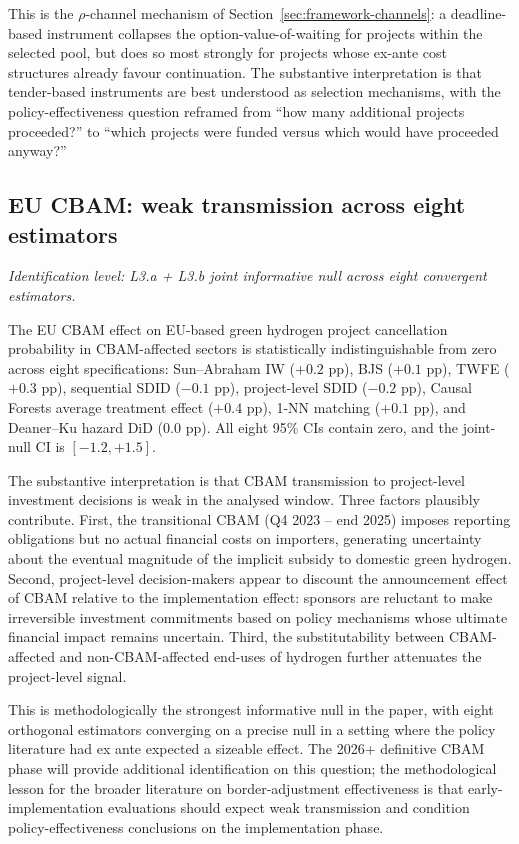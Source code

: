 \documentclass[12pt,a4paper]{article}
\theoremstyle{plain}
\theoremstyle{definition}
\begin{document}
This is the $\rho$-channel mechanism of Section~\ref{sec:framework-channels}: a deadline-based instrument collapses the option-value-of-waiting for projects within the selected pool, but does so most strongly for projects whose ex-ante cost structures already favour continuation. The substantive interpretation is that tender-based instruments are best understood as selection mechanisms, with the policy-effectiveness question reframed from ``how many additional projects proceeded?'' to ``which projects were funded versus which would have proceeded anyway?''

\subsection{EU CBAM: weak transmission across eight estimators}
\label{sec:results-cbam}

\noindent\emph{Identification level: L3.a + L3.b joint informative null across eight convergent estimators.}

The EU CBAM effect on EU-based green hydrogen project cancellation probability in CBAM-affected sectors is statistically indistinguishable from zero across eight specifications: Sun--Abraham IW ($+0.2$ pp), BJS ($+0.1$ pp), TWFE ($+0.3$ pp), sequential SDID ($-0.1$ pp), project-level SDID ($-0.2$ pp), Causal Forests average treatment effect ($+0.4$ pp), 1-NN matching ($+0.1$ pp), and Deaner--Ku hazard DiD ($0.0$ pp). All eight 95\% CIs contain zero, and the joint-null CI is $[-1.2, +1.5]$.

The substantive interpretation is that CBAM transmission to project-level investment decisions is weak in the analysed window. Three factors plausibly contribute. First, the transitional CBAM (Q4 2023 -- end 2025) imposes reporting obligations but no actual financial costs on importers, generating uncertainty about the eventual magnitude of the implicit subsidy to domestic green hydrogen. Second, project-level decision-makers appear to discount the announcement effect of CBAM relative to the implementation effect: sponsors are reluctant to make irreversible investment commitments based on policy mechanisms whose ultimate financial impact remains uncertain. Third, the substitutability between CBAM-affected and non-CBAM-affected end-uses of hydrogen further attenuates the project-level signal.

This is methodologically the strongest informative null in the paper, with eight orthogonal estimators converging on a precise null in a setting where the policy literature had ex ante expected a sizeable effect. The 2026+ definitive CBAM phase will provide additional identification on this question; the methodological lesson for the broader literature on border-adjustment effectiveness is that early-implementation evaluations should expect weak transmission and condition policy-effectiveness conclusions on the implementation phase.
\end{document}
